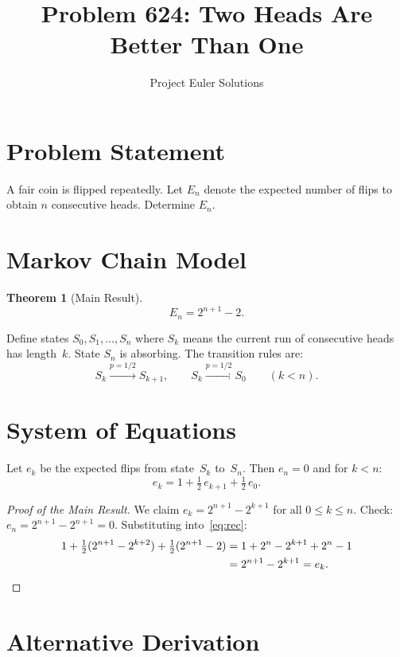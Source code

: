\documentclass[11pt]{article}
\title{Problem 624: Two Heads Are Better Than One}
\author{Project Euler Solutions}
\date{}
\newtheorem{theorem}{Theorem}
\begin{document}
\maketitle

\section{Problem Statement}

A fair coin is flipped repeatedly. Let $E_n$ denote the expected number of flips to obtain $n$ consecutive heads. Determine $E_n$.

\section{Markov Chain Model}

\begin{theorem}[Main Result]
\[
E_n = 2^{n+1} - 2.
\]
\end{theorem}

Define states $S_0, S_1, \ldots, S_n$ where $S_k$ means the current run of consecutive heads has length~$k$. State $S_n$ is absorbing. The transition rules are:
\[
S_k \xrightarrow{p=1/2} S_{k+1}, \qquad S_k \xrightarrow{p=1/2} S_0 \qquad (k < n).
\]

\section{System of Equations}

Let $e_k$ be the expected flips from state~$S_k$ to~$S_n$. Then $e_n = 0$ and for $k < n$:
\begin{equation}\label{eq:rec}
e_k = 1 + \tfrac{1}{2}\,e_{k+1} + \tfrac{1}{2}\,e_0.
\end{equation}

\begin{proof}[Proof of the Main Result]
We claim $e_k = 2^{n+1} - 2^{k+1}$ for all $0 \le k \le n$. Check: $e_n = 2^{n+1} - 2^{n+1} = 0$. Substituting into~\eqref{eq:rec}:
\begin{align*}
1 + \tfrac{1}{2}(2^{n+1} - 2^{k+2}) + \tfrac{1}{2}(2^{n+1} - 2) &= 1 + 2^n - 2^{k+1} + 2^n - 1 \\
&= 2^{n+1} - 2^{k+1} = e_k. \qedhere
\end{align*}
\end{proof}

\section{Alternative Derivation}
\end{document}
